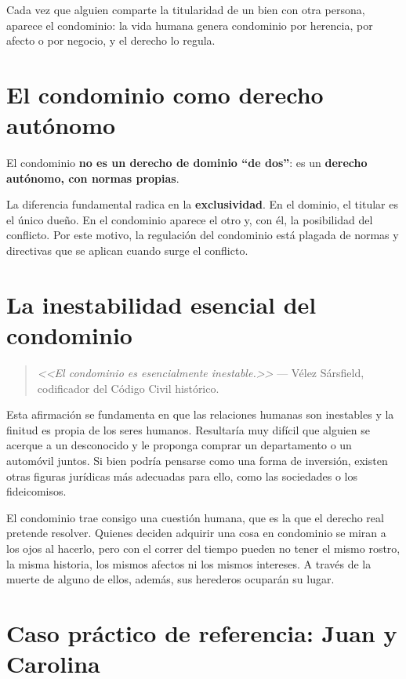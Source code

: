 \documentclass[12pt,oneside]{book}
\begin{document}
Cada vez que alguien comparte la titularidad de un bien con otra persona, aparece el condominio: la vida humana genera condominio por herencia, por afecto o por negocio, y el derecho lo regula.

\section{El condominio como derecho autónomo}

El condominio \textbf{no es un derecho de dominio ``de dos''}: es un \textbf{derecho autónomo, con normas propias}.

La diferencia fundamental radica en la \textbf{exclusividad}. En el dominio, el titular es el único dueño. En el condominio aparece el otro y, con él, la posibilidad del conflicto. Por este motivo, la regulación del condominio está plagada de normas y directivas que se aplican cuando surge el conflicto.

\section{La inestabilidad esencial del condominio}

\begin{quote}
\textit{<<El condominio es esencialmente inestable.>>} --- Vélez Sársfield, codificador del Código Civil histórico.
\end{quote}

Esta afirmación se fundamenta en que las relaciones humanas son inestables y la finitud es propia de los seres humanos. Resultaría muy difícil que alguien se acerque a un desconocido y le proponga comprar un departamento o un automóvil juntos. Si bien podría pensarse como una forma de inversión, existen otras figuras jurídicas más adecuadas para ello, como las sociedades o los fideicomisos.

El condominio trae consigo una cuestión humana, que es la que el derecho real pretende resolver. Quienes deciden adquirir una cosa en condominio se miran a los ojos al hacerlo, pero con el correr del tiempo pueden no tener el mismo rostro, la misma historia, los mismos afectos ni los mismos intereses. A través de la muerte de alguno de ellos, además, sus herederos ocuparán su lugar.

\section{Caso práctico de referencia: Juan y Carolina}
\end{document}
